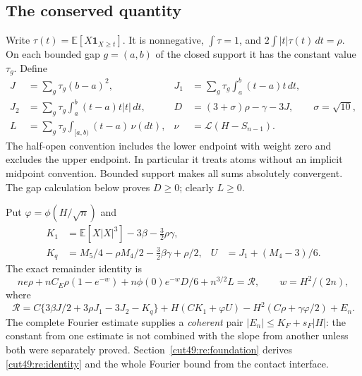 \documentclass[11pt,a4paper]{article}
\numberwithin{equation}{section}
\theoremstyle{definition}
\theoremstyle{remark}
\newcommand{\E}{\mathbb E}
\begin{document}
\subsection{The conserved quantity}
Write $\tau(t)=\E[X\mathbf1_{X\ge t}]$. It is nonnegative,
$\int\tau=1$, and $2\int|t|\tau(t)\,dt=\rho$. On each bounded gap
$g=(a,b)$ of the closed support it has the constant value $\tau_g$.
Define
\begin{align*}
 J&=\sum_g\tau_g(b-a)^2,&
 J_1&=\sum_g\tau_g\int_a^b(t-a)t\,dt,\\
 J_2&=\sum_g\tau_g\int_a^b(t-a)t|t|\,dt,&
 D&=(3+\sigma)\rho-\gamma-3J,\qquad\sigma=\sqrt{10},\\
 L&=\sum_g\tau_g\int_{[a,b)}(t-a)\,\nu(dt),&
 \nu&=\mathcal L(H-S_{n-1}).
\end{align*}
The half-open convention includes the lower endpoint with weight zero
and excludes the upper endpoint. In particular it treats atoms without
an implicit midpoint convention. Bounded support makes all sums
absolutely convergent. The gap calculation below proves $D\ge0$;
clearly $L\ge0$.

Put $\varphi=\phi(H/\sqrt n)$ and
\begin{align*}
 K_1&=\E[X|X|^3]-3\beta-\tfrac32\rho\gamma,\\
 K_q&=M_5/4-\rho M_4/2-\tfrac32\beta\gamma+\rho/2,
 &U&=J_1+(M_4-3)/6.
\end{align*}
The exact remainder identity is
\begin{equation}\label{cut49:re:identity}
 ne\rho+nC_E\rho(1-e^{-w})+
 n\phi(0)e^{-w}D/6+n^{3/2}L=\mathcal R,
 \qquad w=H^2/(2n),
\end{equation}
where
\begin{equation}\label{cut49:re:raw}
 \mathcal R=C\{3\beta J/2+3\rho J_1-3J_2-K_q\}
 +H(CK_1+\varphi U)-H^2(C\rho+\gamma\varphi/2)+E_n.
\end{equation}
The complete Fourier estimate supplies a \emph{coherent} pair
$|E_n|\le K_F+s_F|H|$: the constant from one estimate is not combined
with the slope from another unless both were separately proved.
Section~\ref{cut49:re:foundation} derives \eqref{cut49:re:identity} and the whole
Fourier bound from the contact interface.
\end{document}
